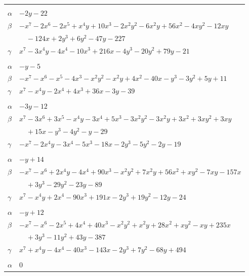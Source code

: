 \documentclass[11pt]{article}
\begin{document}
\begin{longtable}{@{}ll@{}}
\addlinespace[3pt]
\multicolumn{2}{@{}l}{$\{i,j\}=\{22,23\}$, $k_{ij}=2^{2}\cdot 5$}\\
$\alpha$ & $-2y-22$\\
$\beta$ & $-x^{7}-2x^{6}-2x^{5}+x^{4}y+10x^{3}-2x^{2}y^{2}-6x^{2}y+56x^{2}-4xy^{2}-12xy$\\
 & $\quad -124x+2y^{3}+6y^{2}-47y-227$\\
$\gamma$ & $x^{7}-3x^{4}y-4x^{4}-10x^{3}+216x-4y^{3}-20y^{2}+79y-21$\\
\addlinespace[3pt]
\multicolumn{2}{@{}l}{$\{i,j\}=\{23,24\}$, $k_{ij}=2^{2}\cdot 3$}\\
$\alpha$ & $-y-5$\\
$\beta$ & $-x^{7}-x^{6}-x^{5}-4x^{3}-x^{2}y^{2}-x^{2}y+4x^{2}-40x-y^{3}-3y^{2}+5y+11$\\
$\gamma$ & $x^{7}-x^{4}y-2x^{4}+4x^{3}+36x-3y-39$\\
\addlinespace[3pt]
\multicolumn{2}{@{}l}{$\{i,j\}=\{24,29\}$, $k_{ij}=2^{2}\cdot 3^{2}$}\\
$\alpha$ & $-3y-12$\\
$\beta$ & $x^{7}-3x^{6}+3x^{5}-x^{4}y-3x^{4}+5x^{3}-3x^{2}y^{2}-3x^{2}y+3x^{2}+3xy^{2}+3xy$\\
 & $\quad +15x-y^{3}-4y^{2}-y-29$\\
$\gamma$ & $-x^{7}-2x^{4}y-3x^{4}-5x^{3}-18x-2y^{3}-5y^{2}-2y-19$\\
\addlinespace[3pt]
\multicolumn{2}{@{}l}{$\{i,j\}=\{26,27\}$, $k_{ij}=2^{3}\cdot 3^{3}$}\\
$\alpha$ & $-y+14$\\
$\beta$ & $-x^{7}-x^{6}+2x^{4}y-4x^{4}+90x^{3}-x^{2}y^{2}+7x^{2}y+56x^{2}+xy^{2}-7xy-157x$\\
 & $\quad +3y^{3}-29y^{2}-23y-89$\\
$\gamma$ & $x^{7}-x^{4}y+2x^{4}-90x^{3}+191x-2y^{3}+19y^{2}-12y-24$\\
\addlinespace[3pt]
\multicolumn{2}{@{}l}{$\{i,j\}=\{26,28\}$, $k_{ij}=2^{8}\cdot 5$}\\
$\alpha$ & $-y+12$\\
$\beta$ & $-x^{7}-x^{6}-2x^{5}+4x^{4}+40x^{3}-x^{2}y^{2}+x^{2}y+28x^{2}+xy^{2}-xy+235x$\\
 & $\quad +3y^{3}-11y^{2}+43y-387$\\
$\gamma$ & $x^{7}+x^{4}y-4x^{4}-40x^{3}-143x-2y^{3}+7y^{2}-68y+494$\\
\addlinespace[3pt]
\multicolumn{2}{@{}l}{$\{i,j\}=\{27,28\}$, $k_{ij}=2$}\\
$\alpha$ & $0$\\

\end{longtable}
\end{document}
